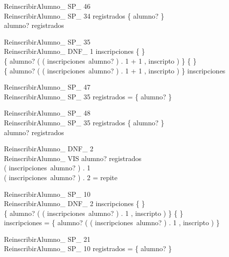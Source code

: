 \documentclass{article}
\begin{document}
\begin{schema}{ReinscribirAlumno\_ SP\_ 46}\\
 ReinscribirAlumno\_ SP\_ 34 
\where
 registrados \neq \{ alumno? \} \\
 alumno? \in registrados
\end{schema}


\begin{schema}{ReinscribirAlumno\_ SP\_ 35}\\
 ReinscribirAlumno\_ DNF\_ 1 
\where
 inscripciones \neq \{ \} \\
 \{ alumno? \mapsto ( ( inscripciones~alumno? ) . 1 + 1 , inscripto ) \} \neq \{ \} \\
 \dom \{ alumno? \mapsto ( ( inscripciones~alumno? ) . 1 + 1 , inscripto ) \} \subset \dom inscripciones
\end{schema}


\begin{schema}{ReinscribirAlumno\_ SP\_ 47}\\
 ReinscribirAlumno\_ SP\_ 35 
\where
 registrados = \{ alumno? \}
\end{schema}


\begin{schema}{ReinscribirAlumno\_ SP\_ 48}\\
 ReinscribirAlumno\_ SP\_ 35 
\where
 registrados \neq \{ alumno? \} \\
 alumno? \in registrados
\end{schema}


\begin{schema}{ReinscribirAlumno\_ DNF\_ 2}\\
 ReinscribirAlumno\_ VIS 
\where
 alumno? \in registrados \\
 ( inscripciones~alumno? ) . 1  \\
 ( inscripciones~alumno? ) . 2 = repite
\end{schema}


\begin{schema}{ReinscribirAlumno\_ SP\_ 10}\\
 ReinscribirAlumno\_ DNF\_ 2 
\where
 inscripciones \neq \{ \} \\
 \{ alumno? \mapsto ( ( inscripciones~alumno? ) . 1 , inscripto ) \} \neq \{ \} \\
 \dom inscripciones = \dom \{ alumno? \mapsto ( ( inscripciones~alumno? ) . 1 , inscripto ) \}
\end{schema}


\begin{schema}{ReinscribirAlumno\_ SP\_ 21}\\
 ReinscribirAlumno\_ SP\_ 10 
\where
 registrados = \{ alumno? \}
\end{schema}
\end{document}
